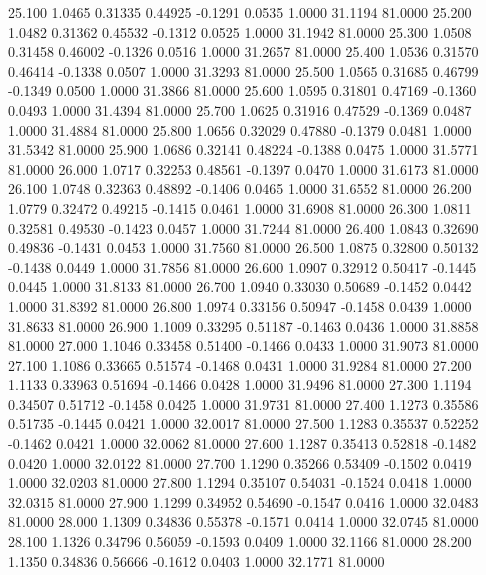   25.100   1.0465   0.31335   0.44925  -0.1291   0.0535   1.0000  31.1194  81.0000
  25.200   1.0482   0.31362   0.45532  -0.1312   0.0525   1.0000  31.1942  81.0000
  25.300   1.0508   0.31458   0.46002  -0.1326   0.0516   1.0000  31.2657  81.0000
  25.400   1.0536   0.31570   0.46414  -0.1338   0.0507   1.0000  31.3293  81.0000
  25.500   1.0565   0.31685   0.46799  -0.1349   0.0500   1.0000  31.3866  81.0000
  25.600   1.0595   0.31801   0.47169  -0.1360   0.0493   1.0000  31.4394  81.0000
  25.700   1.0625   0.31916   0.47529  -0.1369   0.0487   1.0000  31.4884  81.0000
  25.800   1.0656   0.32029   0.47880  -0.1379   0.0481   1.0000  31.5342  81.0000
  25.900   1.0686   0.32141   0.48224  -0.1388   0.0475   1.0000  31.5771  81.0000
  26.000   1.0717   0.32253   0.48561  -0.1397   0.0470   1.0000  31.6173  81.0000
  26.100   1.0748   0.32363   0.48892  -0.1406   0.0465   1.0000  31.6552  81.0000
  26.200   1.0779   0.32472   0.49215  -0.1415   0.0461   1.0000  31.6908  81.0000
  26.300   1.0811   0.32581   0.49530  -0.1423   0.0457   1.0000  31.7244  81.0000
  26.400   1.0843   0.32690   0.49836  -0.1431   0.0453   1.0000  31.7560  81.0000
  26.500   1.0875   0.32800   0.50132  -0.1438   0.0449   1.0000  31.7856  81.0000
  26.600   1.0907   0.32912   0.50417  -0.1445   0.0445   1.0000  31.8133  81.0000
  26.700   1.0940   0.33030   0.50689  -0.1452   0.0442   1.0000  31.8392  81.0000
  26.800   1.0974   0.33156   0.50947  -0.1458   0.0439   1.0000  31.8633  81.0000
  26.900   1.1009   0.33295   0.51187  -0.1463   0.0436   1.0000  31.8858  81.0000
  27.000   1.1046   0.33458   0.51400  -0.1466   0.0433   1.0000  31.9073  81.0000
  27.100   1.1086   0.33665   0.51574  -0.1468   0.0431   1.0000  31.9284  81.0000
  27.200   1.1133   0.33963   0.51694  -0.1466   0.0428   1.0000  31.9496  81.0000
  27.300   1.1194   0.34507   0.51712  -0.1458   0.0425   1.0000  31.9731  81.0000
  27.400   1.1273   0.35586   0.51735  -0.1445   0.0421   1.0000  32.0017  81.0000
  27.500   1.1283   0.35537   0.52252  -0.1462   0.0421   1.0000  32.0062  81.0000
  27.600   1.1287   0.35413   0.52818  -0.1482   0.0420   1.0000  32.0122  81.0000
  27.700   1.1290   0.35266   0.53409  -0.1502   0.0419   1.0000  32.0203  81.0000
  27.800   1.1294   0.35107   0.54031  -0.1524   0.0418   1.0000  32.0315  81.0000
  27.900   1.1299   0.34952   0.54690  -0.1547   0.0416   1.0000  32.0483  81.0000
  28.000   1.1309   0.34836   0.55378  -0.1571   0.0414   1.0000  32.0745  81.0000
  28.100   1.1326   0.34796   0.56059  -0.1593   0.0409   1.0000  32.1166  81.0000
  28.200   1.1350   0.34836   0.56666  -0.1612   0.0403   1.0000  32.1771  81.0000
